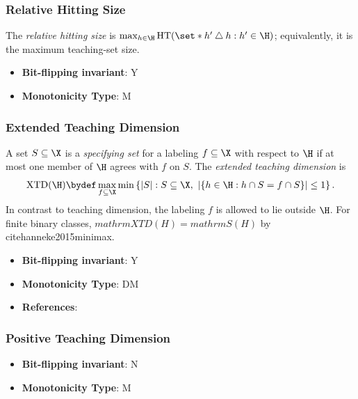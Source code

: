 \subsubsection{Relative Hitting Size}
      
      \begin{definition}\label{def:relative_hitting_size}
      The \emph{relative hitting size} is $\max_{h\in\H}\mathrm{HT}(\set*{h'\mathbin{\triangle}h:h'\in\H})$; equivalently, it is the maximum teaching-set size.
      \end{definition}
      \begin{itemize}
      \item {\bf Bit-flipping invariant}: Y
      \item {\bf Monotonicity Type}: M
      \end{itemize}
\subsubsection{Extended Teaching Dimension}
      
      \begin{definition}\label{def:extended_teaching_dimension}
      A set $S\subseteq\X$ is a \emph{specifying set} for a labeling $f\subseteq\X$ with respect to $\H$ if at most one member of $\H$ agrees with $f$ on $S$.  The \emph{extended teaching dimension} is
      \[
      \mathrm{XTD}(\H)\bydef \max_{f\subseteq\X}\min\left\{|S|:S\subseteq\X,\ \left|\{h\in\H:h\cap S=f\cap S\}\right|\le 1\right\}.
      \]
      In contrast to teaching dimension, the labeling $f$ is allowed to lie outside $\H$.  For finite binary classes, $mathrm{XTD}(H)=mathrm S(H)$ by cite{hanneke2015minimax}.
      \end{definition}
      \begin{itemize}
      \item {\bf Bit-flipping invariant}: Y
      \item {\bf Monotonicity Type}: DM
      \item {\bf References}: \cite{hegedHus1995generalized,hanneke2015minimax}
      \end{itemize}
\subsubsection{Positive Teaching Dimension}
      
      \begin{definition}\label{def:positive_teaching_dimension}
      
      \end{definition}
      \begin{itemize}
      \item {\bf Bit-flipping invariant}: N
      \item {\bf Monotonicity Type}: M
      \end{itemize}
